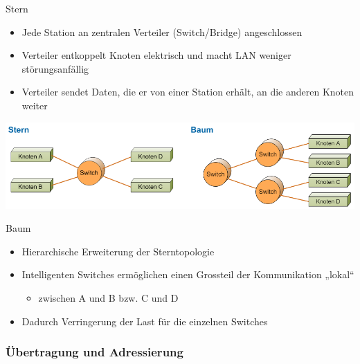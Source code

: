 \begin{definition}{Stern}
\begin{itemize}
    \item Jede Station an zentralen Verteiler (Switch/Bridge) angeschlossen
    \item Verteiler entkoppelt Knoten elektrisch und macht LAN weniger störungsanfällig
    \item Verteiler sendet Daten, die er von einer Station erhält, an die anderen Knoten weiter
\end{itemize}
\end{definition}

 
    \centering
    \includegraphics[width=1\linewidth]{images/stern_baum_topo.png}
 

\begin{definition}{Baum}
    \begin{itemize}
        \item Hierarchische Erweiterung der Sterntopologie
        \item Intelligenten Switches ermöglichen einen Grossteil der Kommunikation „lokal“
        \begin{itemize}
            \item zwischen A und B bzw. C und D
        \end{itemize}
        \item Dadurch Verringerung der Last für die einzelnen Switches
    \end{itemize}
\end{definition}

\subsubsection{Übertragung und Adressierung}


